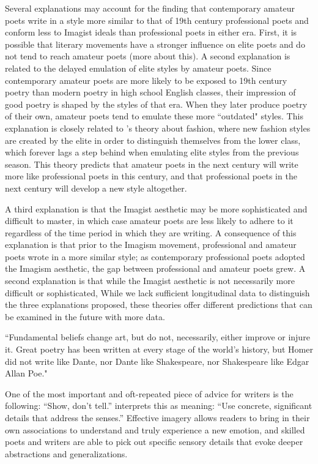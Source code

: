 \documentclass{book}
\begin{document}
Several explanations may account for the finding that contemporary amateur poets write in a style more similar to that of 19th century professional poets and conform less to Imagist ideals than professional poets in either era. First, it is possible that literary movements have a stronger influence on elite poets and do not tend to reach amateur poets (more about this). A second explanation is related to the delayed emulation of elite styles by amateur poets. Since contemporary amateur poets are more likely to be exposed to 19th century poetry than modern poetry in high school English classes, their impression of good poetry is shaped by the styles of that era. When they later produce poetry of their own, amateur poets tend to emulate these more ``outdated" styles. This explanation is closely related to \cite{simmel1957fashion}'s theory about fashion, where new fashion styles are created by the elite in order to distinguish themselves from the lower class, which forever lags a step behind when emulating elite styles from the previous season. This theory predicts that amateur poets in the next century will write more like professional poets in this century, and that professional poets in the next century will develop a new style altogether.

A third explanation is that the Imagist aesthetic may be more sophisticated and difficult to master, in which case amateur poets are less likely to adhere to it regardless of the time period in which they are writing. A consequence of this explanation is that prior to the Imagism movement, professional and amateur poets wrote in a more similar style; as contemporary professional poets adopted the Imagism aesthetic, the gap between professional and amateur poets grew. A second explanation is that while the Imagist aesthetic is not necessarily more difficult or sophisticated,
While we lack sufficient longitudinal data to distinguish the three explanations proposed, these theories offer different predictions that can be examined in the future with more data. 

``Fundamental beliefs change art, but do not, necessarily, either improve or injure it. Great poetry has been written at every stage of the world's history, but Homer did not write like Dante, nor Dante like Shakespeare, nor Shakespeare like Edgar Allan Poe." \citep{lowell1920tendencies}

One of the most important and oft-repeated piece of advice for writers is the following: ``Show, don't tell.'' \cite{Burroway} interprets this as meaning: ``Use concrete, significant details that address the senses.'' Effective imagery allows readers to bring in their own associations to understand and truly experience a new emotion, and skilled poets and writers are able to pick out specific sensory details that evoke deeper abstractions and generalizations. 
\end{document}

